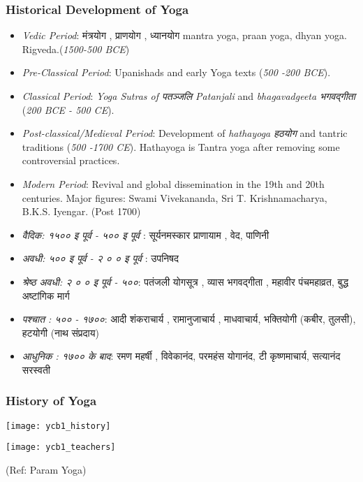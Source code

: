 \begin{frame}[fragile]\frametitle{Historical Development of Yoga}

      \begin{itemize}
	    \item \textit{Vedic Period}: मंत्रयोग ,  प्राणयोग , ध्यानयोग  mantra yoga, praan yoga, dhyan yoga. Rigveda.(\textit{1500-500 BCE})
		\item \textit{Pre-Classical Period}:  Upanishads and early Yoga texts  (\textit{500 -200 BCE}).
		\item \textit{Classical Period}: \textit{Yoga Sutras of  पतञ्जलि  Patanjali} and \textit{bhagavadgeeta भगवद्गीता } (\textit{200 BCE - 500 CE}).
		\item \textit{Post-classical/Medieval Period}: Development of \textit{hathayoga हठयोग } and tantric traditions (\textit{500 -1700 CE}). Hathayoga is Tantra yoga after removing some controversial practices.
		\item \textit{Modern Period}: Revival and global dissemination in the 19th and 20th centuries. Major figures: Swami Vivekananda, Sri T. Krishnamacharya, B.K.S. Iyengar. (Post 1700)
		\item \textit{वैदिक: १५०० इ पूर्व - ५०० इ पूर्व }: सूर्यनमस्कार प्राणायाम , वेद, पाणिनी 
		\item \textit{अवधी: ५०० इ पूर्व -  २ ० ०  इ पूर्व }: उपनिषद
		\item \textit{श्रेष्ठ अवधी:  २ ० ०  इ पूर्व - ५००}: पतंजली  योगसूत्र , व्यास भगवद्गीता , महावीर पंचमहाव्रत, बुद्ध अष्टांगिक मार्ग 
		\item \textit{पश्चात : ५०० - १७००}: आदी शंकराचार्य , रामानुजाचार्य , माधवाचार्य, भक्तियोगी (कबीर, तुलसी), हटयोगी (नाथ संप्रदाय)
		\item \textit{आधुनिक : १७०० के बाद}: रमण महर्षी , विवेकानंद, परमहंस योगानंद, टी कृष्णमाचार्य, सत्यानंद सरस्वती 
		
	  \end{itemize}

\end{frame}

\begin{frame}[fragile]\frametitle{History of Yoga}
      \begin{center}
        \texttt{[image: ycb1\_history]}

        \texttt{[image: ycb1\_teachers]}

		{\tiny (Ref: Param Yoga)}		
        \end{center}

\end{frame}

